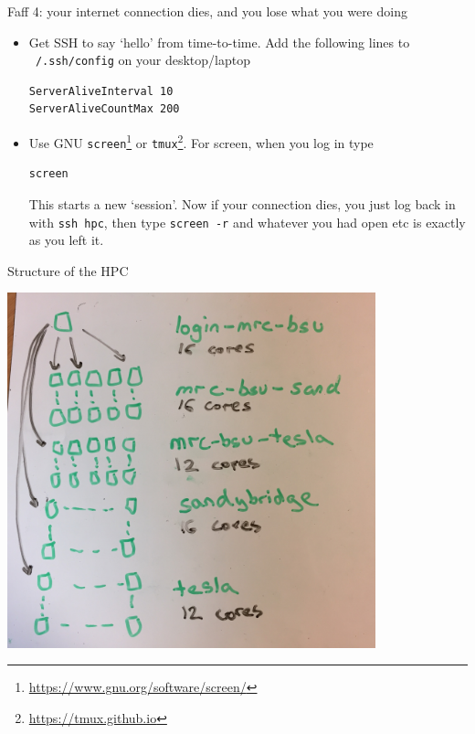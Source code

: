 \documentclass[t,10pt]{beamer}
\let\oldfootnote\footnote
\renewcommand\footnote[1][]{\oldfootnote[frame,#1]}
\begin{document}
\begin{frame}[fragile]{Faff 4: your internet connection dies, and you lose what you were doing}

\begin{itemize}
\item Get SSH to say `hello' from time-to-time. Add the following lines to \texttt{~/.ssh/config} on your desktop/laptop

\begin{verbatim}
ServerAliveInterval 10
ServerAliveCountMax 200
\end{verbatim}

\item Use GNU \texttt{screen}\footnote{\url{https://www.gnu.org/software/screen/}} or \texttt{tmux}\footnote{\url{https://tmux.github.io}}.
For screen, when you log in type
\begin{verbatim}
screen
\end{verbatim}

This starts a new `session'. Now if your connection dies, you just log back in with \texttt{ssh hpc}, then type \texttt{screen -r} and whatever you had open etc is exactly as you left it.
\end{itemize}
\end{frame}

\begin{frame}{Structure of the HPC}

\centering
\includegraphics[width=0.8\textwidth]{hpc-structure2}
\end{frame}
\end{document}
